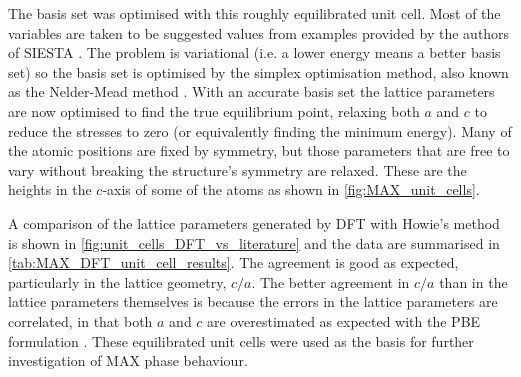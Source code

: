 The basis set was optimised with this roughly equilibrated unit cell. Most of the variables are taken to be suggested values  from examples provided by the authors of SIESTA \cite{SIESTA_manual}. The problem is variational (i.e. a lower energy means a better basis set) so the basis set is optimised by the simplex optimisation method, also known as the Nelder-Mead method \citep{Nelder1965}. With an accurate basis set the lattice parameters are now optimised to find the true equilibrium point, relaxing both $a$ and $c$ to reduce the stresses to zero (or equivalently finding the minimum energy). Many of the atomic positions are fixed by symmetry, but those parameters that are free to vary without breaking the structure's symmetry are relaxed. These are the heights in the $c$-axis of some of the atoms as shown in \autoref{fig:MAX_unit_cells}.


A comparison of the lattice parameters generated by DFT with Howie's method is shown in \autoref{fig:unit_cells_DFT_vs_literature} and the data are summarised in \autoref{tab:MAX_DFT_unit_cell_results}. The agreement is good as expected, particularly in the lattice geometry, $c/a$. The better agreement in $c/a$ than in the lattice parameters themselves is because the errors in the lattice parameters are correlated, in that both $a$ and $c$ are overestimated as expected with the PBE formulation \cite{Staroverov2004,Staroverov2008erratum}. These equilibrated unit cells were used as the basis for further investigation of MAX phase behaviour.

